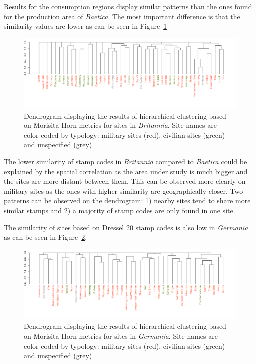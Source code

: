\documentclass[review]{elsarticle}
\newcommand{\memo}[2]{\textcolor{#1}{#2}}
\newcommand{\xavi}[1]{\memo{magenta}{XRC: #1\\}}
\begin{document}
Results for the consumption regions display similar patterns than the ones found for the production area of \textit{Baetica}. The most important difference is that the similarity values are lower as can be seen in Figure~\ref{britmap}


\begin{figure}
	\centering
\includegraphics[angle=180,width=\linewidth]{figs/dendrobrit5.pdf}
\caption{Dendrogram displaying the results of hierarchical clustering based on Morisita-Horn metrics for sites in \textit{Britannia}. Site names are color-coded by typology: military sites (red), civilian sites (green) and unspecified (grey)}
\label{britmap}
\end{figure}

The lower similarity of stamp codes in \textit{Britannia} compared to \textit{Baetica} could be explained by the spatial correlation as the area under study is much bigger and the sites are more distant between them. This can be observed more clearly on military sites as the ones with higher similarity are geographically closer. Two patterns can be observed on the dendrogram: 1) nearby sites tend to share more similar stamps and 2) a majority of stamp codes are only found in one site.

    
 
The similarity of sites based on Dressel 20 stamp codes is also low in \textit{Germania} as can be seen in Figure~\ref{germap}. 

\begin{figure}
	\centering
\includegraphics[angle=180, width=\linewidth]{figs/dendroger5.pdf}
\caption{Dendrogram displaying the results of hierarchical clustering based on Morisita-Horn metrics for sites in \textit{Germania}. Site names are color-coded by typology: military sites (red), civilian sites (green) and unspecified (grey)}
\label{germap}
\end{figure}
\end{document}
